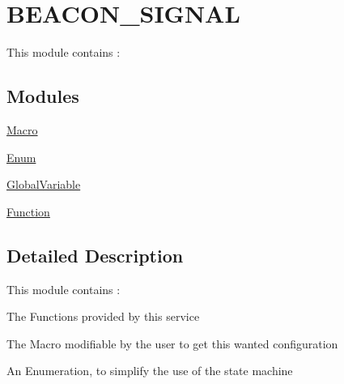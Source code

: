 \hypertarget{group__beacon_signal___module}{\section{B\+E\+A\+C\+O\+N\+\_\+\+S\+I\+G\+N\+A\+L}
\label{group__beacon_signal___module}
}


This module contains \+:  


\subsection*{Modules}
\begin{DoxyCompactItemize}
\item 
\hyperlink{group__beacon_signal___macro}{Macro}
\item 
\hyperlink{group__beacon_signal___enum}{Enum}
\item 
\hyperlink{group__beacon_signal___global_variable}{Global\+Variable}
\item 
\hyperlink{group__beacon_signal___function}{Function}
\end{DoxyCompactItemize}


\subsection{Detailed Description}
This module contains \+: 


\begin{DoxyItemize}
\item The Functions provided by this service
\end{DoxyItemize}

The Macro modifiable by the user to get this wanted configuration
\begin{DoxyItemize}
\item An Enumeration, to simplify the use of the state machine 
\end{DoxyItemize}